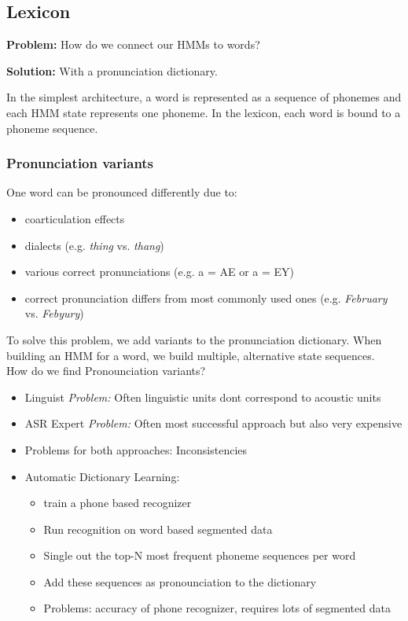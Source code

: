 \subsection{Lexicon}

\textbf{Problem:} How do we connect our HMMs to words?

\vspace{5pt}

\textbf{Solution:} With a pronunciation dictionary.

\vspace{10pt}

In the simplest architecture, a word is represented as a sequence of phonemes and each HMM state represents one phoneme. In the lexicon, each word is bound to a phoneme sequence.

\subsubsection{Pronunciation variants}

One word can be pronounced differently due to:
\begin{itemize}
    \item coarticulation effects
    \item dialects (e.g. \textit{thing} vs. \textit{thang})
    \item various correct pronunciations (e.g. a = AE or a = EY)
    \item correct pronunciation differs from most commonly used ones (e.g. \textit{February} vs. \textit{Febyury})
\end{itemize}
To solve this problem, we add variants to the pronunciation dictionary. When building an HMM for a word, we build multiple, alternative state sequences.
\\
How do we find Pronounciation variants?
\begin{itemize}
\item Linguist \emph{Problem:} Often linguistic units dont correspond to acoustic units
\item ASR Expert \emph{Problem:} Often most successful approach but also very expensive 
\item Problems for both approaches: Inconsistencies
\item Automatic Dictionary Learning: 
\begin{itemize}
\item train a phone based recognizer
\item Run recognition on word based segmented data
\item Single out the top-N most frequent phoneme sequences per word
\item Add these sequences as pronounciation to the dictionary
\item Problems: accuracy of phone recognizer, requires lots of segmented data
\end{itemize}

\end{itemize}



